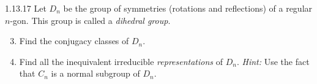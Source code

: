 \documentclass{../../math174}
\date{2019 April 1 (Monday)}
\author{}
\begin{document}
\begin{problemlist}
\item[1.13.17] Let \(D_n\) be the group of symmetries (rotations and
  reflections) of a regular \(n\)-gon.  This group is called a
  \emph{dihedral group}.
  \begin{enumerate} \setcounter{enumi}{2}
  \item Find the conjugacy classes of \(D_n\).

    \begin{solution}

    \end{solution}

  \item Find all the inequivalent irreducible \emph{representations}
    of \(D_n\).  \textit{Hint:} Use the fact that \(C_n\) is a normal
    subgroup of \(D_n\).

    \begin{solution}

    \end{solution}
  \end{enumerate}
\end{problemlist}
\end{document}
